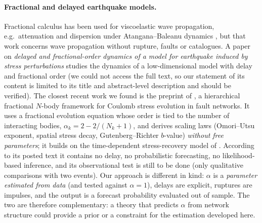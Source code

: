\documentclass[11pt,a4paper]{article}
\begin{document}
\paragraph{Fractional and delayed earthquake models.}
Fractional calculus has been used for viscoelastic wave propagation, e.g.\ attenuation and dispersion under Atangana--Baleanu dynamics \citep{DemirKocyigit2025}, but that work concerns wave propagation without rupture, faults or catalogues. A paper on \emph{delayed and fractional-order dynamics of a model for earthquake induced by stress perturbations} \citep{PhysScr2024} studies the dynamics of a low-dimensional model with delay and fractional order (we could not access the full text, so our statement of its content is limited to its title and abstract-level description and should be verified). The closest recent work we found is the preprint of \citet{Chishtie2026}, a hierarchical fractional $N$-body framework for Coulomb stress evolution in fault networks. It uses a fractional evolution equation whose order is tied to the number of interacting bodies, $\alpha_k=2-2/(N_k+1)$, and derives scaling laws (Omori--Utsu exponent, spatial stress decay, Gutenberg--Richter $b$-value) \emph{without free parameters}; it builds on the time-dependent stress-recovery model of \citet{DahmHainzl2022}. According to its posted text it contains no delay, no probabilistic forecasting, no likelihood-based inference, and its observational test is still to be done (only qualitative comparisons with two events). Our approach is different in kind: $\alpha$ is a \emph{parameter estimated from data} (and tested against $\alpha=1$), delays are explicit, ruptures are impulses, and the output is a forecast probability evaluated out of sample. The two are therefore complementary: a theory that predicts $\alpha$ from network structure could provide a prior or a constraint for the estimation developed here.
\end{document}
